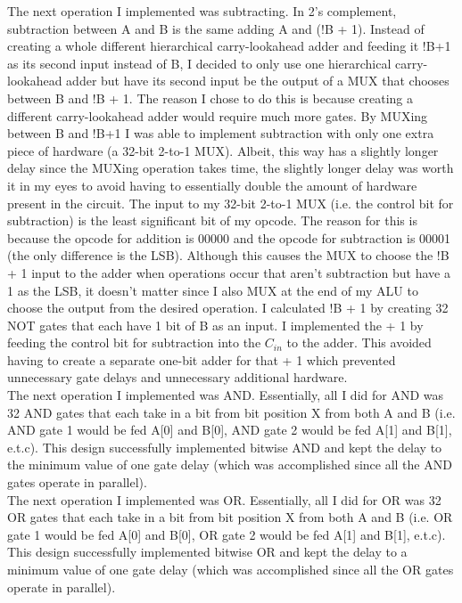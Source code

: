 \documentclass[letterpaper]{article} %
\begin{document}
    The next operation I implemented was subtracting. In 2's complement, subtraction between A and B is the same adding A and (!B + 1). Instead of creating a whole different hierarchical carry-lookahead adder and feeding it !B+1 as its second input instead of B, I decided to only use one hierarchical carry-lookahead adder but have its second input be the output of a MUX that chooses between B and !B + 1. The reason I chose to do this is because creating a different carry-lookahead adder would require much more gates. By MUXing between B and !B+1 I was able to implement subtraction with only one extra piece of hardware (a 32-bit 2-to-1 MUX). Albeit, this way has a slightly longer delay since the MUXing operation takes time, the slightly longer delay was worth it in my eyes to avoid having to essentially double the amount of hardware present in the circuit. The input to my 32-bit 2-to-1 MUX (i.e. the control bit for subtraction) is the least significant bit of my opcode. The reason for this is because the opcode for addition is 00000 and the opcode for subtraction is 00001 (the only difference is the LSB). Although this causes the MUX to choose the !B + 1 input to the adder when operations occur that aren't subtraction but have a 1 as the LSB, it doesn't matter since I also MUX at the end of my ALU to choose the output from the desired operation. I calculated !B + 1 by creating 32 NOT gates that each have 1 bit of B as an input. I implemented the + 1 by feeding the control bit for subtraction into the $C_{in}$ to the adder. This avoided having to create a separate one-bit adder for that + 1 which prevented unnecessary gate delays and unnecessary additional hardware. \\
    
    The next operation I implemented was AND. Essentially, all I did for AND was 32 AND gates that each take in a bit from bit position X from both A and B (i.e. AND gate 1 would be fed A[0] and B[0], AND gate 2 would be fed A[1] and B[1], e.t.c). This design successfully implemented bitwise AND and kept the delay to the minimum value of one gate delay (which was accomplished since all the AND gates operate in parallel).\\
    
    The next operation I implemented was OR. Essentially, all I did for OR was 32 OR gates that each take in a bit from bit position X from both A and B (i.e. OR gate 1 would be fed A[0] and B[0], OR gate 2 would be fed A[1] and B[1], e.t.c). This design successfully implemented bitwise OR and kept the delay to a minimum value of one gate delay (which was accomplished since all the OR gates operate in parallel). \\
    
\end{document}
